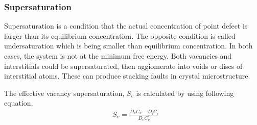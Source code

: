 \documentclass[a4paper]{article}
\begin{document}
    \newpage
    \subsubsection{Supersaturation} \hspace{10pt}
    Supersaturation is a condition that the actual concentration of point defect is larger than its equilibrium concentration. The opposite condition is called undersaturation which is being smaller than equilibrium concentration. In both cases, the system is not at the minimum free energy. Both vacancies and interstitials could be supersaturated, then aggiomerate into voids or discs of interstitial atoms. These can produce stacking faults in crystal microstructure.

    The effective vacancy supersaturation, ${S_v}$ is calculated by using following equation,\cite{was2016}\\

    \begin{equation}
      \begin{aligned}
        &S_v=\frac{D_vC_v-D_iC_i}{D_vC_v^e}\\
      \end{aligned}
    \end{equation}\\
\end{document}

